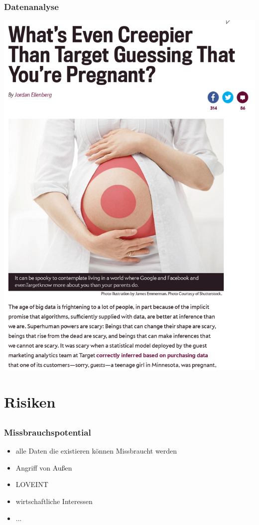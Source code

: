 \documentclass[12pt]{beamer}
\begin{document}
\begin{frame}
  \frametitle{Datenanalyse}
  \pause
  \begin{center}
    \includegraphics[height=0.8\textheight]{img/pregnant.png}
  \end{center}
\end{frame}

\section{Risiken}
\subsection{}

\begin{frame}
  \frametitle{Missbrauchspotential}
  \begin{itemize}
    \item<2-> alle Daten die existieren können Missbraucht werden
    \item<3-> Angriff von Außen
    \item<4-> LOVEINT
    \item<5-> wirtschaftliche Interessen
    \item<6-> ...
  \end{itemize}
\end{frame}
\end{document}
